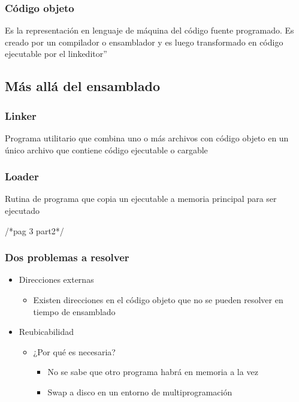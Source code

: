 	\subsubsection{Código objeto}
		Es la representación en lenguaje de máquina del código fuente programado. Es creado por un compilador o ensamblador y es luego transformado en código ejecutable por el linkeditor”


\subsection{Más allá del ensamblado}
	\subsubsection{Linker}
		Programa utilitario que combina uno o más archivos con código objeto en un único archivo que contiene código ejecutable o cargable

	\subsubsection{Loader}
		Rutina de programa que copia un ejecutable a memoria principal para ser ejecutado

		/*pag 3 part2*/


	\subsubsection{Dos problemas a resolver}
	\begin{itemize}
	\item Direcciones externas
		\begin{itemize}
		\item Existen direcciones en el código objeto que no se pueden resolver en tiempo de ensamblado
		\end{itemize}	
	\item Reubicabilidad
		\begin{itemize}
		\item ¿Por qué es necesaria?
			\begin{itemize}
			\item No se sabe que otro programa habrá en memoria a la vez
			\item Swap a disco en un entorno de multiprogramación
			\end{itemize}	
		\end{itemize}	
	\end{itemize}	

